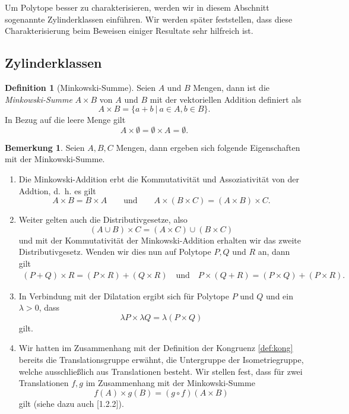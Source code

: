 \documentclass[11pt,titlepage]{article}
\theoremstyle{definition}
\newtheorem{definition}[theorem]{Definition}
\newtheorem{remark}[theorem]{Bemerkung}
\theoremstyle{remark}
\begin{document}
	Um Polytope besser zu charakterisieren, werden wir in diesem Abschnitt 
	sogenannte Zylinderklassen einführen. Wir werden später feststellen, 
	dass diese Charakterisierung beim Beweisen einiger Resultate sehr 
	hilfreich ist.

	\subsection{Zylinderklassen}
	
	\begin{definition}[Minkowski-Summe]
		Seien $A$ und $B$ Mengen, dann ist die \textsl{Minkowski-Summe} $A\times B$ 
		von $A$ und $B$ mit der vektoriellen Addition definiert als
		\[A\times B=\left.\{a+b\ \right\vert\ a\in A,b\in B\}.\]
		In Bezug auf die leere Menge gilt
		\[A\times \emptyset =\emptyset\times A=\emptyset.\]
	\end{definition}
	
	\begin{remark} \label{bem:mink}
		Seien $A,B,C$ Mengen, dann ergeben sich folgende Eigenschaften 
		mit der Minkowski-Summe.
		\begin{enumerate}
			\item Die Minkowski-Addition erbt die Kommutativität und Assoziativität von der Addtion, d.~h. 
			es gilt
			\[A\times B=B\times A\qquad\text{und}\qquad A\times(B\times C)=(A\times B)\times C.\]
			
			\item \label{bem:mink;3} 
			Weiter gelten auch die Distributivgesetze, also 
			\[(A\cup B)\times C=(A\times C)\cup (B\times C)\]
			und mit der Kommutativität der Minkowski-Addition erhalten wir das zweite 
			Distributivgesetz. Wenden wir dies nun auf Polytope 
			$P,Q$ und $R$ an, dann gilt
			\begin{align}
			(P+Q)\times R =(P\times R)+(Q\times R)\quad\text{und}\quad
			P\times (Q+R)=(P\times Q)+(P\times R).
			\end{align}
			\item \label{bem:mink;1}In Verbindung mit der Dilatation ergibt sich für Polytope 
			$P$ und $Q$ und ein $\lambda>0$, dass
			\[\lambda P\times \lambda Q=\lambda(P\times Q)\]
			gilt.
			\item \label{bem:mink;2} 
			Wir hatten im Zusammenhang mit der Definition der 
			Kongruenz \ref{def:kong} bereits die Translationsgruppe 
			erwähnt, die Untergruppe der Isometriegruppe, welche ausschließlich 
			aus Translationen besteht. Wir stellen fest, dass für zwei 
			Translationen $f,g$ im Zusammenhang mit der Minkowski-Summe 
			\[f(A)\times g(B)=(g\circ f)(A\times B)\]
			gilt (siehe dazu auch \cite{Hadwiger}[1.2.2]).
		\end{enumerate}
	\end{remark}
	
\end{document}
